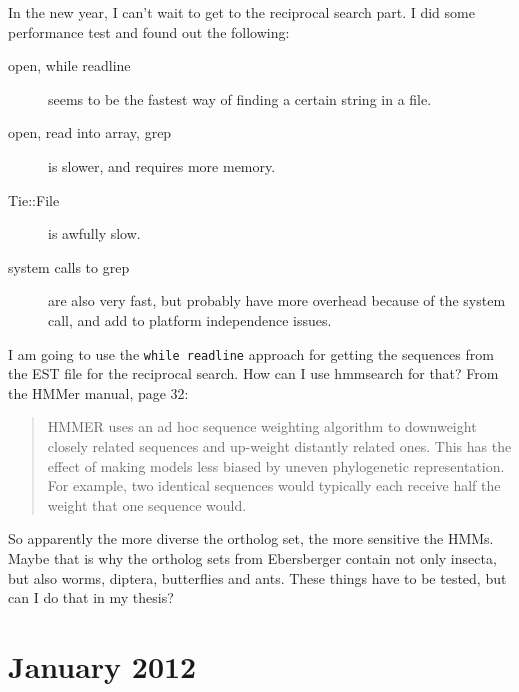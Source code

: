 In the new year, I can't wait to get to the reciprocal search part. I did some
performance test and found out the following:

\begin{description}
	\item[open, while readline] seems to be the fastest way of finding
	a certain string in a file. 
	\item[open, read into array, grep] is slower, and requires more memory.
	\item[Tie::File] is awfully slow.
	\item[system calls to grep] are also very fast, but probably have more
	overhead because of the system call, and add to platform independence issues.
\end{description}

I am going to use the \lstinline{while readline} approach for getting the
sequences from the EST file for the reciprocal search. How can I use hmmsearch
for that? From the HMMer manual, page 32:

\begin{quote}
HMMER uses an ad hoc sequence weighting algorithm to downweight closely related
sequences and up-weight distantly related ones. This has the effect of making
models less biased by uneven phylogenetic representation. For example, two
identical sequences would typically each receive half the weight that one
sequence would. 
\end{quote}

So apparently the more diverse the ortholog set, the more sensitive the HMMs.
Maybe that is why the ortholog sets from Ebersberger contain not only insecta,
but also worms, diptera, butterflies and ants. These things have to be tested,
but can I do that in my thesis? 


\section{January 2012}
